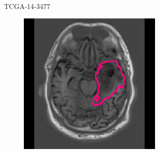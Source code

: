 \begin{subappendices}
\begin{figure}[htbp]
\begin{subfigure}[b]{0.8\textwidth}
\begin{subfigure}[b]{0.215\textwidth}
        \end{subfigure}
        \caption{TCGA-14-3477}\label{fig:hgg_example_tcga143477}
    \end{subfigure}
    \begin{subfigure}[b]{0.8\textwidth}
        \centering
        \hfill
        \begin{subfigure}[b]{0.215\textwidth}
        \includegraphics[width=\textwidth, clip, trim=2.5cm 0.5cm 2.5cm 0.5cm]{Figures/Random_segs/T1_TCGA-19-5951.png}
        \end{subfigure}
        \hfill
        \begin{subfigure}[b]{0.215\textwidth}

\end{subfigure}
\end{subfigure}
\end{figure}
\end{subappendices}
